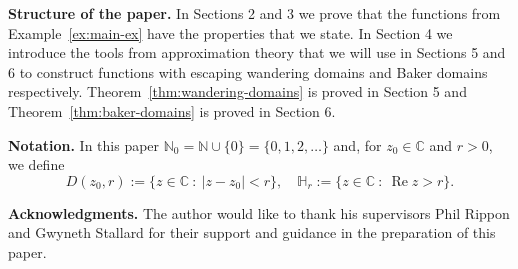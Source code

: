 \documentclass[a4paper, 12pt, reqno]{amsart}
\newcommand{\margin}[1]{\marginnote{\red{#1}}}
\numberwithin{equation}{section}
\newcommand{\red}[1]{{\color{red} #1}}
\theoremstyle{plain}
\theoremstyle{definition}
\theoremstyle{remark}
\newcommand{\C}{{\mathbb{C}}}
\newcommand{\N}{{\mathbb{N}}}
\renewcommand{\Re}{\operatorname{Re}}
\begin{document}



\vspace{5pt}

\noindent 
\textbf{Structure of the paper.} In Sections 2 and 3 we prove that the functions from Example~\ref{ex:main-ex} have the properties that we state. In Section 4 we introduce the tools from approximation theory that we will use in Sections 5 and 6 to construct functions with escaping wandering domains and Baker domains respectively. Theorem~\ref{thm:wandering-domains} is proved in Section 5 and Theorem~\ref{thm:baker-domains} is proved in Section 6.

\vspace{5pt}

\noindent
\textbf{Notation.} In this paper $\N_0=\N\cup\{0\}=\{0,1,2,\hdots\}$ and, for $z_0\in \C$ and $r>0$, we define
$$
D(z_0,r):=\{z\in\C\ :\ |z-z_0|<r\},\quad \mathbb H_r:=\{z\in\C\ :\ \Re z>r\}. 
$$


\vspace{10pt}

\noindent
\textbf{Acknowledgments.} The author would like to thank his supervisors Phil Rippon and Gwyneth Stallard for their support and guidance in the preparation of this paper.
\end{document}
